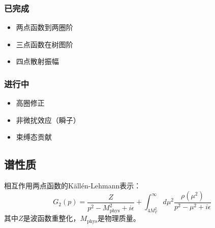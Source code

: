 \subsubsection{已完成}
\begin{itemize}
    \item 两点函数到两圈阶
    \item 三点函数在树图阶
    \item 四点散射振幅
\end{itemize}

\subsubsection{进行中}
\begin{itemize}
    \item 高圈修正
    \item 非微扰效应（瞬子）
    \item 束缚态贡献
\end{itemize}

\subsection{谱性质}

相互作用两点函数的Källén-Lehmann表示：
\begin{equation}
    G_2(p) = \frac{Z}{p^2 - M_{\text{phys}}^2 + i\epsilon} + \int_{4M_T^2}^\infty d\mu^2 \frac{\rho(\mu^2)}{p^2 - \mu^2 + i\epsilon}
\end{equation}
其中$Z$是波函数重整化，$M_{\text{phys}}$是物理质量。
